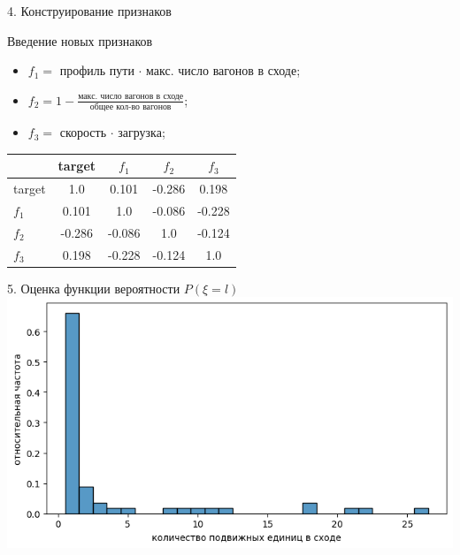 \documentclass[aspectratio=169]{beamer}
\begin{document}
    \begin{frame}{4. Конструирование признаков}
        \begin{block}{Введение новых признаков}
            \begin{itemize}
                \item $f_1 = $ профиль пути $\cdot$ макс. число вагонов в сходе;
                \item $f_2 = 1 - \frac{\text{макс. число вагонов в сходе}}{\text{общее кол-во вагонов}}$;
                \item $f_3 = $ скорость $\cdot$ загрузка;
            \end{itemize}
        \end{block}
    
        \begin{center}
            \begin{tabular}{|l|c|c|c|c|}
                \hline
                & target & $f_1$ & $f_2$ & $f_3$ \\ \hline
                target & 1.0       & 0.101  & -0.286 & 0.198  \\ \hline
                $f_1$  & 0.101  & 1.0       & -0.086 & -0.228 \\ \hline
                $f_2$  & -0.286 & -0.086 & 1.0       & -0.124 \\ \hline
                $f_3$  & 0.198  & -0.228 & -0.124 & 1.0       \\ \hline
            \end{tabular}
        \end{center}
    \end{frame}


    \begin{frame}{5. Оценка функции вероятности $P(\xi = l)$}
        \centering
        \includegraphics[width=1.3\textheight]{src/KDE.png}
    \end{frame}
\end{document}
